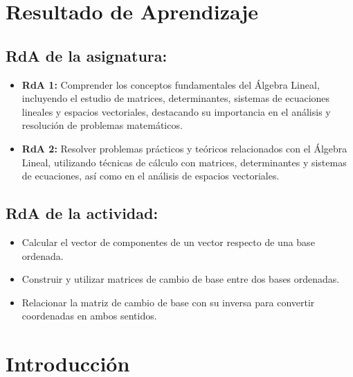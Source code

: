 \documentclass[a4,11pt]{aleph-notas}
\begin{document}
\encabezado 

\section*{Resultado de Aprendizaje}

\subsection*{RdA de la asignatura:}
\begin{itemize}[leftmargin=*]
    \item \textbf{RdA 1:} Comprender los conceptos fundamentales del Álgebra Lineal, incluyendo el estudio de matrices, determinantes, sistemas de ecuaciones lineales y espacios vectoriales, destacando su importancia en el análisis y resolución de problemas matemáticos.
    \item \textbf{RdA 2:} Resolver problemas prácticos y teóricos relacionados con el Álgebra Lineal, utilizando técnicas de cálculo con matrices, determinantes y sistemas de ecuaciones, así como en el análisis de espacios vectoriales.    
\end{itemize}


\subsection*{RdA de la actividad:}
\begin{itemize}[leftmargin=*]
    \item Calcular el vector de componentes de un vector respecto de una base ordenada.
    \item Construir y utilizar matrices de cambio de base entre dos bases ordenadas.
    \item Relacionar la matriz de cambio de base con su inversa para convertir coordenadas en ambos sentidos.
\end{itemize}

\section*{Introducción}
\end{document}

